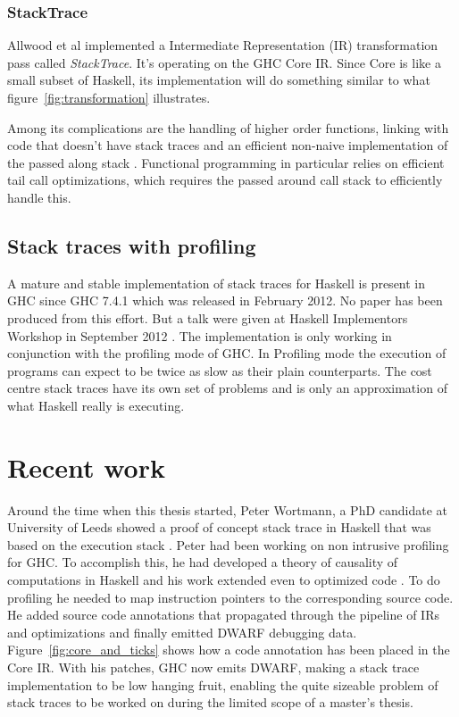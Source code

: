 \subsubsection{StackTrace}

Allwood et al implemented a Intermediate Representation (IR) transformation
pass called \emph{StackTrace}. It's operating on the GHC Core IR. Since
Core is like a small subset of Haskell, its implementation will do
something similar to what figure~\ref{fig:transformation} illustrates.

Among its complications are the
handling of higher order functions, linking with code that doesn't have stack
traces and an efficient non-naive implementation of the
passed along stack \cite{FindingTheNeedle2009}.
Functional programming in particular relies on efficient tail call
optimizations, which
requires the passed around call stack to efficiently handle this.

\subsection{Stack traces with profiling} \label{sec:stack_traces_with_profiling}

A mature and stable implementation of stack traces for
Haskell is present in GHC since GHC 7.4.1 which was released in February
2012. No paper has been produced from this effort. But a talk were
given at Haskell Implementors Workshop in September 2012 \cite{HIW2012Programme}.
The implementation is only working in conjunction with the profiling
mode of GHC. In Profiling mode the execution of programs can expect to
be twice as slow as their plain counterparts. The cost centre stack traces
have its own set of problems and is only an approximation of what Haskell
really is executing.

\section{Recent work} \label{sec:recent_work}

Around the time when this thesis started, Peter Wortmann, a
PhD candidate at University of Leeds showed a proof of concept
stack trace in Haskell that was based on the execution stack
\cite{stack_traces_ticket}. Peter had been working on non intrusive
profiling for GHC. To accomplish this, he had developed a theory of
causality of computations in Haskell and his work extended even to
optimized code \cite{DBLP:conf/haskell/WortmannD13}. To do profiling
he needed to map instruction pointers to the corresponding source
code. He added source code annotations that propagated
through the pipeline of IRs and optimizations and finally emitted DWARF
debugging data. Figure~\ref{fig:core_and_ticks} shows how a code
annotation has been placed in the Core IR. With his patches, GHC now
emits DWARF, making a stack trace implementation to be low hanging
fruit, enabling the quite sizeable problem of stack traces to be worked
on during the limited scope of a master's thesis.

